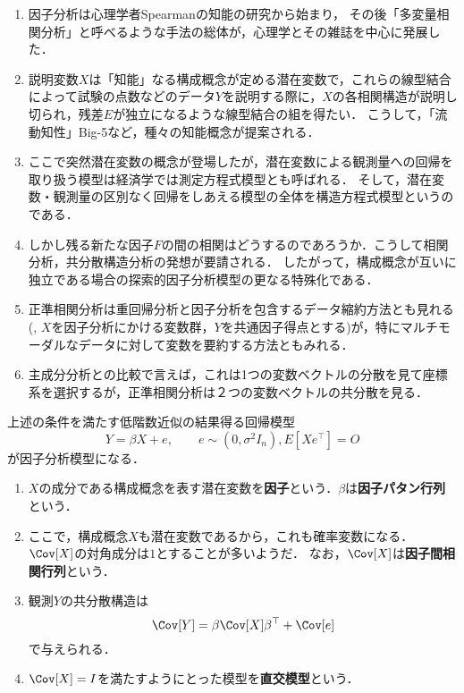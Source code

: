 \documentclass[uplatex,dvipdfmx]{jsreport}
\begin{document}
\begin{history}[因子分析の歴史]\mbox{}
    \begin{enumerate}
        \item 因子分析は心理学者Spearman\cite{Spearman04}の知能の研究から始まり，
        その後「多変量相関分析」と呼べるような手法の総体が，心理学とその雑誌を中心に発展した．
        \item 説明変数$X$は「知能」なる構成概念が定める潜在変数で，これらの線型結合によって試験の点数などのデータ$Y$を説明する際に，$X$の各相関構造が説明し切られ，残差$E$が独立になるような線型結合の組を得たい．
        こうして，「流動知性」Big-5など，種々の知能概念が提案される．
        \item ここで突然潜在変数の概念が登場したが，潜在変数による観測量への回帰を取り扱う模型は経済学では測定方程式模型とも呼ばれる\cite{豊田秀樹-実践編}．
        そして，潜在変数・観測量の区別なく回帰をしあえる模型の全体を構造方程式模型というのである．
        \item しかし残る新たな因子$F$の間の相関はどうするのであろうか．こうして相関分析，共分散構造分析の発想が要請される．
        したがって，構成概念が互いに独立である場合の探索的因子分析模型の更なる特殊化である．
        \item 正準相関分析は重回帰分析と因子分析を包含するデータ縮約方法とも見れる(\cite{Levine77-CanonicalAnalysis}, 
        $X$を因子分析にかける変数群，$Y$を共通因子得点とする)が，特にマルチモーダルなデータに対して変数を要約する方法ともみれる．
        \item 主成分分析との比較で言えば，これは1つの変数ベクトルの分散を見て座標系を選択するが，正準相関分析は２つの変数ベクトルの共分散を見る．
    \end{enumerate}
\end{history}

\begin{model}
    上述の条件を満たす低階数近似の結果得る回帰模型
    \[Y=\beta X+e,\qquad e\sim(0,\sigma^2I_n),E[Xe^\top]=O\]
    が因子分析模型になる．
    \begin{enumerate}
        \item $X$の成分である構成概念を表す潜在変数を\textbf{因子}という．$\beta$は\textbf{因子パタン行列}という\cite{豊田秀樹-理論編}．
        \item ここで，構成概念$X$も潜在変数であるから，これも確率変数になる．$\Cov[X]$の対角成分は$1$とすることが多いようだ\cite{豊田秀樹-理論編}．
        なお，$\Cov[X]$は\textbf{因子間相関行列}という．
        \item 観測$Y$の共分散構造は
        \[\Cov[Y]=\beta\Cov[X]\beta^\top+\Cov[e]\]
        で与えられる．
        \item $\Cov[X]=I$を満たすようにとった模型を\textbf{直交模型}という\cite{豊田秀樹-実践編}．
    \end{enumerate}
\end{model}
\end{document}

